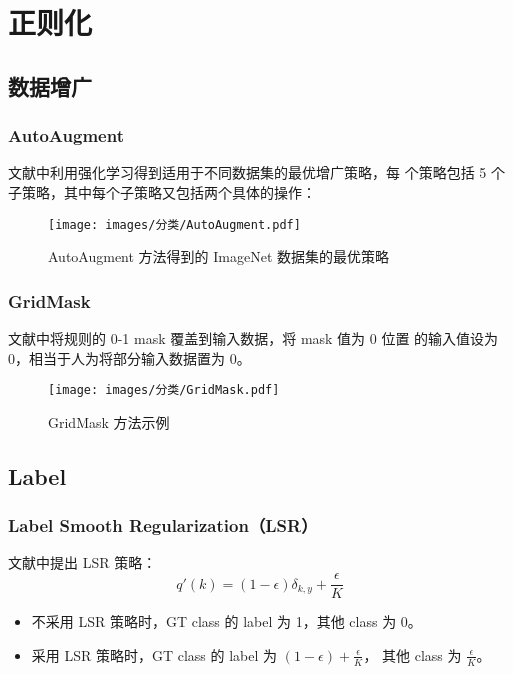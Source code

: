 \section{正则化}
\subsection{数据增广}
\subsubsection{AutoAugment}
文献中利用强化学习得到适用于不同数据集的最优增广策略，每
个策略包括 5 个子策略，其中每个子策略又包括两个具体的操作：

\begin{figure}[ht]
  \centering
  \texttt{[image: images/分类/AutoAugment.pdf]}
  \caption{AutoAugment 方法得到的 ImageNet 数据集的最优策略}
  \label{fig:autoaugment}
\end{figure}


\subsubsection{GridMask}
文献中将规则的 0-1 mask 覆盖到输入数据，将 mask 值为 0 位置
的输入值设为 0，相当于人为将部分输入数据置为 0。

\begin{figure}[ht]
  \centering
  \texttt{[image: images/分类/GridMask.pdf]}
  \caption{GridMask 方法示例}
  \label{fig:gridmask}
\end{figure}

\subsection{Label}
\subsubsection{Label Smooth Regularization（LSR）}
文献中提出 LSR 策略：
\begin{equation}
  q'(k) = (1-\epsilon) \delta_{k,y} + \frac{\epsilon}{K}
\end{equation}

\begin{itemize}
  \item 不采用 LSR 策略时，GT class 的 label 为 1，其他 class 为 0。
  \item 采用 LSR 策略时，GT class 的 label 为 $(1-\epsilon) + \frac{\epsilon}{K}$，
    其他 class 为 $\frac{\epsilon}{K}$。
\end{itemize}

